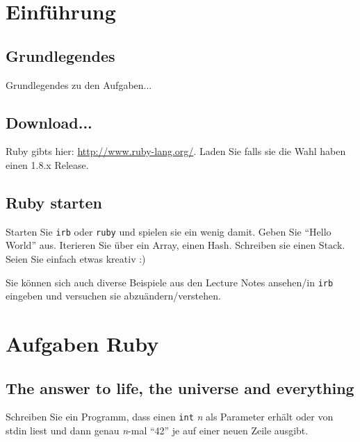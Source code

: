 \documentclass[a4paper,11pt,oneside]{scrbook}
\begin{document}
\renewcommand{\theequation}{\thesection.\arabic}
\setcapindent*{1em}


\chapter{Einführung} %
\label{cha:einführung}

\section{Grundlegendes} %
\label{sec:Grundlegendes}
Grundlegendes zu den Aufgaben...



\section{Download...} %
\label{sec:download_}
Ruby gibts hier: \url{http://www.ruby-lang.org/}. Laden Sie falls sie die Wahl haben einen 1.8.x Release.

\section{Ruby starten} %
\label{sec:ruby_starten}
Starten Sie \texttt{irb} oder \texttt{ruby} und spielen sie ein wenig damit. Geben Sie “Hello World” aus. Iterieren Sie über ein Array, einen Hash. Schreiben sie einen Stack. Seien Sie einfach etwas kreativ :)

Sie können sich auch diverse Beispiele aus den Lecture Notes ansehen/in \texttt{irb} eingeben und versuchen sie abzuändern/verstehen.








\chapter{Aufgaben Ruby} %
\label{cha:Aufgaben Ruby}


\section{The answer to life, the universe and everything} %
\label{sec:the_answer_to_life_the_universe_and_everything}
Schreiben Sie ein Programm, dass einen \texttt{int} \emph{n} als Parameter erhält oder von stdin liest und dann genau \emph{n}-mal “42” je auf einer neuen Zeile ausgibt.
\end{document}
